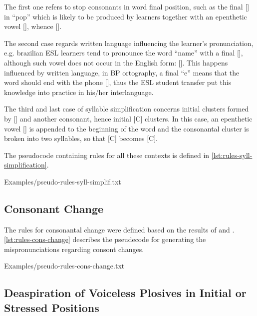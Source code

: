 The first one refers to stop consonants in word 
final position, such as the final [] in ``pop'' which is likely to be produced by learners
together with an epenthetic vowel [], whence []. 

The second case regards written language
influencing the learner's pronunciation, e.g. brazilian \ac{ESL} learners tend to pronounce the word ``name'' with a final 
[], although such vowel does not occur in the English form: []. This happens influenced by written language,
in \ac{BP} ortography, a final ``e'' means that the word should end with the phone [], thus the \ac{ESL} student
transfer put this knowledge into practice in his/her interlanguage. 

The third and last case of syllable simplification concerns initial clusters formed
by [] and another consonant, hence initial [C] clusters. In this case, an epenthetic vowel [] is appended to the
beginning of the word and the consonantal cluster is broken into two syllables, so that [C] becomes [C].

The pseudocode containing rules for all these contexts is defined in \autoref{lst:rules-syll-simplification}.

%
    {Examples/pseudo-rules-syll-simplif.txt}

\subsection{Consonant Change}\label{sec:consonant-change}
The rules for consonantal change were defined based on the results of
\citeauthor{Reis2006} \citep{Reis2006} and \citeauthor{Trevisol2010} \citep{Trevisol2010}.
\autoref{lst:rules-cons-change} describes the pseudecode for generating the mispronunciations regarding consont changes.

%
    {Examples/pseudo-rules-cons-change.txt}
    
\subsection{Deaspiration of Voiceless Plosives in Initial or Stressed Positions}


